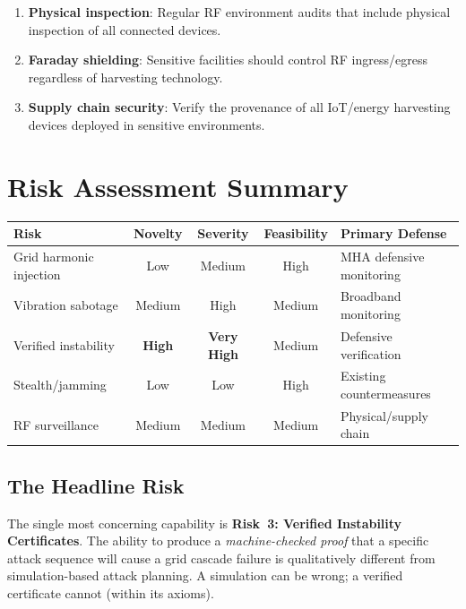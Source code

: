 \documentclass[11pt,a4paper]{article}
\begin{document}
\begin{enumerate}
  \item \textbf{Physical inspection}: Regular RF environment audits
    that include physical inspection of all connected devices.
  \item \textbf{Faraday shielding}: Sensitive facilities should
    control RF ingress/egress regardless of harvesting technology.
  \item \textbf{Supply chain security}: Verify the provenance of
    all IoT/energy harvesting devices deployed in sensitive
    environments.
\end{enumerate}

\section{Risk Assessment Summary}

\begin{center}
\small
\begin{tabular}{@{}lcccl@{}}
\toprule
\textbf{Risk} & \textbf{Novelty} & \textbf{Severity} &
\textbf{Feasibility} & \textbf{Primary Defense} \\
\midrule
Grid harmonic injection & Low & Medium & High & MHA defensive monitoring \\
Vibration sabotage & Medium & High & Medium & Broadband monitoring \\
Verified instability & \textbf{High} & \textbf{Very High} &
  Medium & Defensive verification \\
Stealth/jamming & Low & Low & High & Existing countermeasures \\
RF surveillance & Medium & Medium & Medium & Physical/supply chain \\
\bottomrule
\end{tabular}
\end{center}

\subsection{The Headline Risk}

The single most concerning capability is \textbf{Risk~3: Verified
Instability Certificates}. The ability to produce a
\emph{machine-checked proof} that a specific attack sequence will
cause a grid cascade failure is qualitatively different from
simulation-based attack planning. A simulation can be wrong; a
verified certificate cannot (within its axioms).
\end{document}
